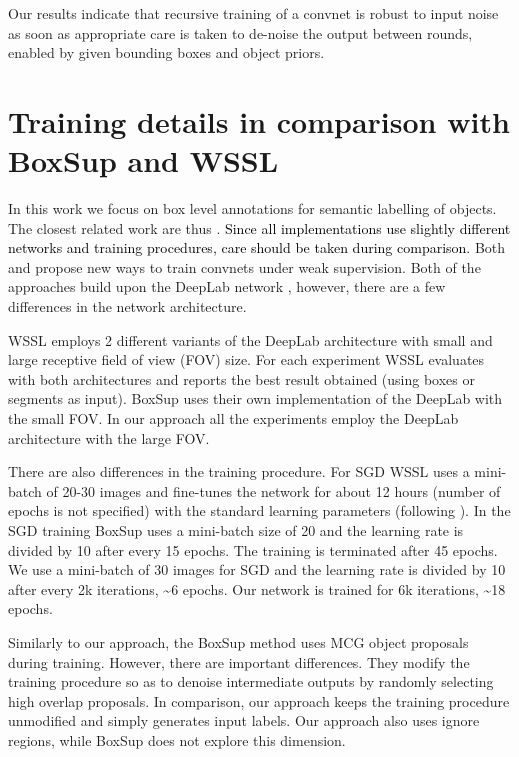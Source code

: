 \documentclass[10pt,english,british,twocolumn]{article}
\begin{document}
Our results indicate that recursive training of a convnet is robust
to input noise as soon as appropriate care is taken to de-noise the
output between rounds, enabled by given bounding boxes and object
priors. 

\section{\label{sec:Training-details-in}Training details in comparison with
BoxSup and WSSL}

In this work we focus on box level annotations for semantic labelling
of objects. The closest related work are thus \cite{Dai2015Iccv,Papandreou2015Iccv}.
\textcolor{black}{Since all implementations use slightly different
networks and training procedures, care should be taken during comparison.}
Both \cite{Dai2015Iccv} and \cite{Papandreou2015Iccv} propose new
ways to train convnets under weak supervision. Both of the approaches
build upon the DeepLab network \cite{Chen2015Iclr}, however, there
are a few differences in the network architecture. 

WSSL \cite{Papandreou2015Iccv} employs 2 different variants of the
DeepLab architecture with small and large receptive field of view
(FOV) size. For each experiment WSSL evaluates with both architectures
and reports the best result obtained (using boxes or segments as input).
BoxSup \cite{Dai2015Iccv} uses their own implementation of the DeepLab
with the small FOV. In our approach all the experiments employ the
DeepLab architecture with the large FOV.

There are also differences in the training procedure. For SGD WSSL
uses a mini-batch of 20-30 images and fine-tunes the network for about
12 hours (number of epochs is not specified) with the standard learning
parameters (following \cite{Chen2015Iclr}). In the SGD training BoxSup
uses a mini-batch size of 20 and the learning rate is divided by 10
after every 15 epochs. The training is terminated after 45 epochs.
We use a mini-batch of 30 images for SGD and the learning rate is
divided by 10 after every 2k iterations, \textasciitilde{}6 epochs.
Our network is trained for 6k iterations, \textasciitilde{}18 epochs.

Similarly to our approach, the BoxSup method \cite{Dai2015Iccv} uses
MCG object proposals during training. However, there are important
differences. They modify the training procedure so as to denoise intermediate
outputs by randomly selecting high overlap proposals. In comparison,
our approach keeps the training procedure unmodified and simply generates
input labels. Our approach also uses ignore regions, while BoxSup
does not explore this dimension. 
\end{document}
